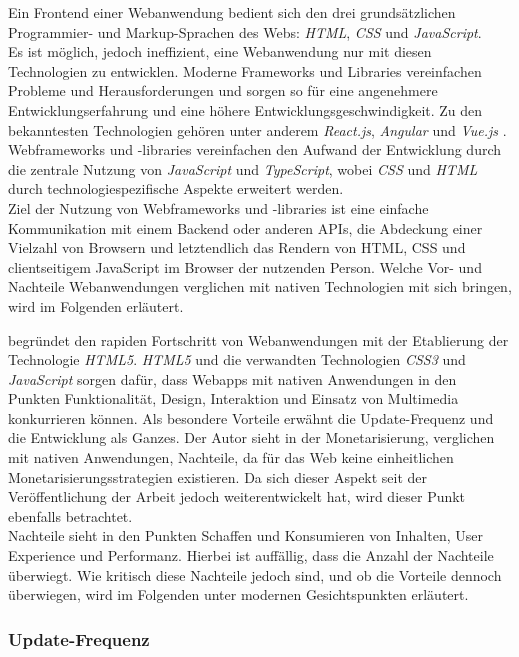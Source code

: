 \documentclass[a4paper]{scrartcl}
\begin{document}
Ein Frontend einer Webanwendung bedient sich den drei grundsätzlichen Programmier- und Markup-Sprachen des Webs: \textit{HTML}, \textit{CSS} und \textit{JavaScript}. \\
Es ist möglich, jedoch ineffizient, eine Webanwendung nur mit diesen Technologien zu entwicklen. Moderne Frameworks und Libraries vereinfachen Probleme und Herausforderungen und sorgen so für eine angenehmere Entwicklungserfahrung und eine höhere Entwicklungsgeschwindigkeit. Zu den bekanntesten Technologien gehören unter anderem \textit{React.js}, \textit{Angular} und \textit{Vue.js} \autocite{Clement}. Webframeworks und -libraries vereinfachen den Aufwand der Entwicklung durch die zentrale Nutzung von \textit{JavaScript} und \textit{TypeScript}, wobei \textit{CSS} und \textit{HTML} durch technologiespezifische Aspekte erweitert werden. \\
Ziel der Nutzung von Webframeworks und -libraries ist eine einfache Kommunikation mit einem Backend oder anderen APIs, die Abdeckung einer Vielzahl von Browsern und letztendlich das Rendern von HTML, CSS und clientseitigem JavaScript im Browser der nutzenden Person. Welche Vor- und Nachteile Webanwendungen verglichen mit nativen Technologien mit sich bringen, wird im Folgenden erläutert.

\textcite[27]{Jobe} begründet den rapiden Fortschritt von Webanwendungen mit der Etablierung der Technologie \textit{HTML5}. \textit{HTML5} und die verwandten Technologien \textit{CSS3} und \textit{JavaScript} sorgen dafür, dass Webapps mit nativen Anwendungen in den Punkten Funktionalität, Design, Interaktion und Einsatz von Multimedia konkurrieren können. Als besondere Vorteile erwähnt \textcite[28]{Jobe} die Update-Frequenz und die Entwicklung als Ganzes. Der Autor sieht in der Monetarisierung, verglichen mit nativen Anwendungen, Nachteile, da für das Web keine einheitlichen Monetarisierungsstrategien existieren. Da sich dieser Aspekt seit der Veröffentlichung der Arbeit jedoch weiterentwickelt hat, wird dieser Punkt ebenfalls betrachtet. \\
Nachteile sieht \textcite[28]{Jobe} in den Punkten Schaffen und Konsumieren von Inhalten, User Experience und Performanz. Hierbei ist auffällig, dass die Anzahl der Nachteile überwiegt. Wie kritisch diese Nachteile jedoch sind, und ob die Vorteile dennoch überwiegen, wird im Folgenden unter modernen Gesichtspunkten erläutert. \\

\subsubsection{Update-Frequenz}
\end{document}
